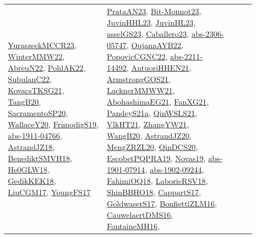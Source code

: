 {\begin{longtable}{llp{6cm}p{6cm}p{6cm}}
\href{articles/YuraszeckMCCR23.pdf}{YuraszeckMCCR23}\cite{YuraszeckMCCR23}, \href{papers/WinterMMW22.pdf}{WinterMMW22}\cite{WinterMMW22}, \href{articles/AbreuN22.pdf}{AbreuN22}\cite{AbreuN22}, \href{articles/PohlAK22.pdf}{PohlAK22}\cite{PohlAK22}, \href{articles/SubulanC22.pdf}{SubulanC22}\cite{SubulanC22}, \href{papers/KovacsTKSG21.pdf}{KovacsTKSG21}\cite{KovacsTKSG21}, \href{papers/TangB20.pdf}{TangB20}\cite{TangB20}, \href{articles/SacramentoSP20.pdf}{SacramentoSP20}\cite{SacramentoSP20}, \href{articles/WallaceY20.pdf}{WallaceY20}\cite{WallaceY20}, \href{papers/FrimodigS19.pdf}{FrimodigS19}\cite{FrimodigS19}, \href{articles/abs-1911-04766.pdf}{abs-1911-04766}\cite{abs-1911-04766}, \href{papers/AstrandJZ18.pdf}{AstrandJZ18}\cite{AstrandJZ18}, \href{papers/BenediktSMVH18.pdf}{BenediktSMVH18}\cite{BenediktSMVH18}, \href{papers/He0GLW18.pdf}{He0GLW18}\cite{He0GLW18}, \href{articles/GedikKEK18.pdf}{GedikKEK18}\cite{GedikKEK18}, \href{papers/LiuCGM17.pdf}{LiuCGM17}\cite{LiuCGM17}, \href{papers/YoungFS17.pdf}{YoungFS17}\cite{YoungFS17} & \href{articles/PrataAN23.pdf}{PrataAN23}\cite{PrataAN23}, \href{papers/Bit-Monnot23.pdf}{Bit-Monnot23}\cite{Bit-Monnot23}, \href{papers/JuvinHHL23.pdf}{JuvinHHL23}\cite{JuvinHHL23}, \href{papers/JuvinHL23.pdf}{JuvinHL23}\cite{JuvinHL23}, \href{papers/asselGS23.pdf}{asselGS23}\cite{asselGS23}, \href{articles/Caballero23.pdf}{Caballero23}\cite{Caballero23}, \href{articles/abs-2306-05747.pdf}{abs-2306-05747}\cite{abs-2306-05747}, \href{papers/OujanaAYB22.pdf}{OujanaAYB22}\cite{OujanaAYB22}, \href{papers/PopovicCGNC22.pdf}{PopovicCGNC22}\cite{PopovicCGNC22}, \href{articles/abs-2211-14492.pdf}{abs-2211-14492}\cite{abs-2211-14492}, \href{papers/AntuoriHHEN21.pdf}{AntuoriHHEN21}\cite{AntuoriHHEN21}, \href{papers/ArmstrongGOS21.pdf}{ArmstrongGOS21}\cite{ArmstrongGOS21}, \href{papers/LacknerMMWW21.pdf}{LacknerMMWW21}\cite{LacknerMMWW21}, \href{articles/AbohashimaEG21.pdf}{AbohashimaEG21}\cite{AbohashimaEG21}, \href{articles/FanXG21.pdf}{FanXG21}\cite{FanXG21}, \href{articles/PandeyS21a.pdf}{PandeyS21a}\cite{PandeyS21a}, \href{articles/QinWSLS21.pdf}{QinWSLS21}\cite{QinWSLS21}, \href{articles/VlkHT21.pdf}{VlkHT21}\cite{VlkHT21}, \href{articles/ZhangYW21.pdf}{ZhangYW21}\cite{ZhangYW21}, \href{papers/WangB20.pdf}{WangB20}\cite{WangB20}, \href{articles/AstrandJZ20.pdf}{AstrandJZ20}\cite{AstrandJZ20}, \href{articles/MengZRZL20.pdf}{MengZRZL20}\cite{MengZRZL20}, \href{articles/QinDCS20.pdf}{QinDCS20}\cite{QinDCS20}, \href{articles/EscobetPQPRA19.pdf}{EscobetPQPRA19}\cite{EscobetPQPRA19}, \href{articles/Novas19.pdf}{Novas19}\cite{Novas19}, \href{articles/abs-1901-07914.pdf}{abs-1901-07914}\cite{abs-1901-07914}, \href{articles/abs-1902-09244.pdf}{abs-1902-09244}\cite{abs-1902-09244}, \href{articles/FahimiOQ18.pdf}{FahimiOQ18}\cite{FahimiOQ18}, \href{articles/LaborieRSV18.pdf}{LaborieRSV18}\cite{LaborieRSV18}, \href{articles/ShinBBHO18.pdf}{ShinBBHO18}\cite{ShinBBHO18}, \href{papers/CappartS17.pdf}{CappartS17}\cite{CappartS17}, \href{papers/GoldwaserS17.pdf}{GoldwaserS17}\cite{GoldwaserS17}, \href{papers/BonfiettiZLM16.pdf}{BonfiettiZLM16}\cite{BonfiettiZLM16}, \href{papers/CauwelaertDMS16.pdf}{CauwelaertDMS16}\cite{CauwelaertDMS16}, \href{papers/FontaineMH16.pdf}{FontaineMH16}\cite{FontaineMH16}, 
\end{longtable}}
